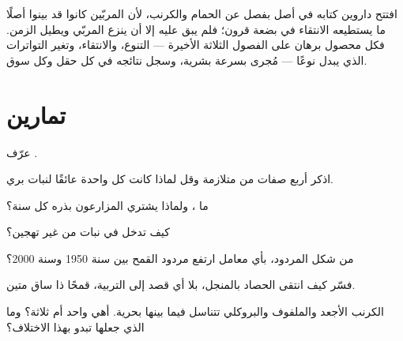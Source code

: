 \begin{remark}\label{rem:g12:domesticated-plants:oldest}
افتتح داروين كتابه في أصل  بفصل عن الحمام والكرنب، لأن المربّين
كانوا قد بينوا أصلًا ما يستطيعه الانتقاء في بضعة قرون؛ فلم يبق عليه
إلا أن ينزع المربّي ويطيل الزمن. فكل محصول برهان على الفصول الثلاثة
الأخيرة --- التنوع، والانتقاء، وتغير التواترات الذي يبدل نوعًا ---
مُجرى بسرعة بشرية، وسجل نتائجه في كل حقل وكل سوق.
\end{remark}

\section{تمارين}

\begin{exercise}[$\star$]\label{exo:g12:domesticated-plants:1}
عرّف  .
\end{exercise}

\begin{exercise}[$\star$]\label{exo:g12:domesticated-plants:2}
اذكر أربع صفات من متلازمة  وقل لماذا كانت كل واحدة عائقًا لنبات
بري.
\end{exercise}

\begin{exercise}[$\star$]\label{exo:g12:domesticated-plants:3}
ما ، ولماذا يشتري المزارعون بذره كل سنة؟
\end{exercise}

\begin{exercise}[$\star$]\label{exo:g12:domesticated-plants:4}
كيف تدخل  في نبات من غير تهجين؟
\end{exercise}

\begin{exercise}[$\star$]\label{exo:g12:domesticated-plants:5}
من شكل المردود، بأي معامل ارتفع مردود القمح بين سنة 1950 وسنة 2000؟
\end{exercise}

\begin{exercise}[$\star\star$]\label{exo:g12:domesticated-plants:6}
فسّر كيف انتقى الحصاد بالمنجل، بلا أي قصد إلى التربية، قمحًا ذا ساق
متين.
\end{exercise}

\begin{exercise}[$\star\star$]\label{exo:g12:domesticated-plants:7}
الكرنب الأجعد والملفوف والبروكلي تتناسل فيما بينها بحرية. أهي 
واحد أم ثلاثة؟ وما الذي جعلها تبدو بهذا الاختلاف؟
\end{exercise}

